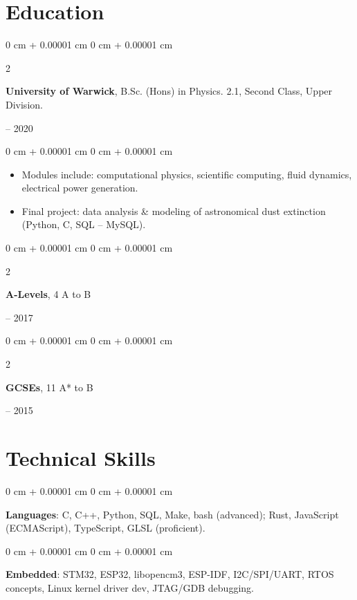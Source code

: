 \documentclass[10pt, letterpaper]{article}
\newenvironment{highlights}{
    \begin{itemize}[
        topsep=0.15 cm,
        parsep=0.15 cm,
        partopsep=0pt,
        itemsep=0pt,
        leftmargin=0 cm + 10pt
    ]
}{
    \end{itemize}
}
\newenvironment{onecolentry}{
    \begin{adjustwidth}{
        0 cm + 0.00001 cm
    }{
        0 cm + 0.00001 cm
    }
}{
    \end{adjustwidth}
}
\newenvironment{twocolentry}[2][]{
    \onecolentry
    \def\secondColumn{#2}
    \setcolumnwidth{\fill, 4.5 cm}
    \begin{paracol}{2}
}{
    \switchcolumn \raggedleft \secondColumn
    \end{paracol}
    \endonecolentry
}
\begin{document}
    \section{Education}
        \begin{twocolentry}{
            2017 – 2020
        }
            \textbf{University of Warwick}, B.Sc. (Hons) in Physics. 2.1, Second Class, Upper Division.
        \end{twocolentry}

        \vspace{0.10 cm}
        \begin{onecolentry}
            \begin{highlights}
                \item Modules include: computational physics, scientific computing, fluid dynamics, electrical power generation.
                \item Final project: data analysis \& modeling of astronomical dust extinction (Python, C, SQL -- MySQL).
            \end{highlights}
        \end{onecolentry}
        \vspace{0.10 cm}

        \begin{twocolentry}{
            2015 – 2017
        }
            \textbf{A-Levels}, 4 A to B
        \end{twocolentry}

        \begin{twocolentry}{
            2010 – 2015
        }
            \textbf{GCSEs}, 11 A* to B
        \end{twocolentry}


    \section{Technical Skills}

        \begin{onecolentry}
            \textbf{Languages}: C, C++, Python, SQL, Make, bash (advanced); Rust, JavaScript (ECMAScript), TypeScript, GLSL (proficient).
        \end{onecolentry}

        \vspace{0.2 cm}

        \begin{onecolentry}
            \textbf{Embedded}: STM32, ESP32, libopencm3, ESP-IDF, I2C/SPI/UART, RTOS concepts, Linux kernel driver dev, JTAG/GDB debugging.
        \end{onecolentry}
\end{document}
